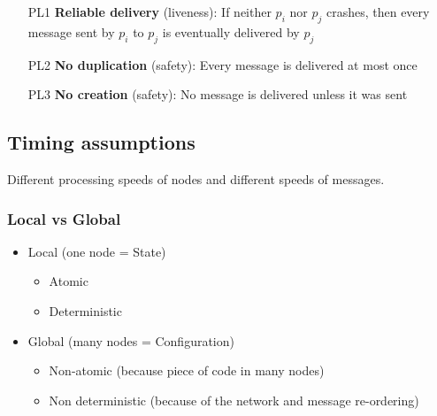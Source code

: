 \begin{itemize}
        

        \begin{enumerate}
            \item[PL1] \textbf{Reliable delivery} (liveness):
                If neither $p_i$ nor $p_j$ crashes, then every message sent
                by $p_i$ to $p_j$ is eventually delivered by $p_j$

            \item[PL2] \textbf{No duplication} (safety): Every message is delivered
                at most once

            \item[PL3] \textbf{No creation} (safety): No message is delivered unless it was
                sent
        \end{enumerate}

\end{itemize}

\subsection{Timing assumptions}

Different processing speeds of nodes and different speeds of messages.

\subsubsection{Local vs Global}
\begin{itemize}
    \item Local (one node = State)
        \begin{itemize}
            \item Atomic
            \item Deterministic
        \end{itemize}
    \item Global (many nodes = Configuration)
        \begin{itemize}
            \item Non-atomic (because piece of code in many nodes)
            \item Non deterministic (because of the network and message re-ordering)
        \end{itemize}
\end{itemize}


